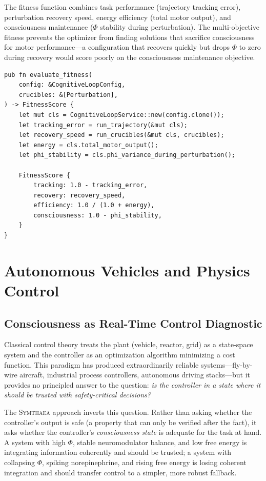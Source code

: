 \documentclass[12pt]{book}
\newcommand{\symthaea}{\textsc{Symthaea}}
\begin{document}
The fitness function combines task performance (trajectory tracking error), perturbation recovery speed, energy efficiency (total motor output), and consciousness maintenance ($\Phi$ stability during perturbation). The multi-objective fitness prevents the optimizer from finding solutions that sacrifice consciousness for motor performance---a configuration that recovers quickly but drops $\Phi$ to zero during recovery would score poorly on the consciousness maintenance objective.

\begin{lstlisting}[caption={Neuroevolution fitness evaluation for motor control.},label=lst:neuroevo-fitness]
pub fn evaluate_fitness(
    config: &CognitiveLoopConfig,
    crucibles: &[Perturbation],
) -> FitnessScore {
    let mut cls = CognitiveLoopService::new(config.clone());
    let tracking_error = run_trajectory(&mut cls);
    let recovery_speed = run_crucibles(&mut cls, crucibles);
    let energy = cls.total_motor_output();
    let phi_stability = cls.phi_variance_during_perturbation();

    FitnessScore {
        tracking: 1.0 - tracking_error,
        recovery: recovery_speed,
        efficiency: 1.0 / (1.0 + energy),
        consciousness: 1.0 - phi_stability,
    }
}
\end{lstlisting}


\chapter{Autonomous Vehicles and Physics Control}
\label{ch:vehicles}

\section{Consciousness as Real-Time Control Diagnostic}

Classical control theory treats the plant (vehicle, reactor, grid) as a state-space system and the controller as an optimization algorithm minimizing a cost function. This paradigm has produced extraordinarily reliable systems---fly-by-wire aircraft, industrial process controllers, autonomous driving stacks---but it provides no principled answer to the question: \textit{is the controller in a state where it should be trusted with safety-critical decisions?}

The \symthaea{} approach inverts this question. Rather than asking whether the controller's output is safe (a property that can only be verified after the fact), it asks whether the controller's \textit{consciousness state} is adequate for the task at hand. A system with high $\Phi$, stable neuromodulator balance, and low free energy is integrating information coherently and should be trusted; a system with collapsing $\Phi$, spiking norepinephrine, and rising free energy is losing coherent integration and should transfer control to a simpler, more robust fallback.
\end{document}
